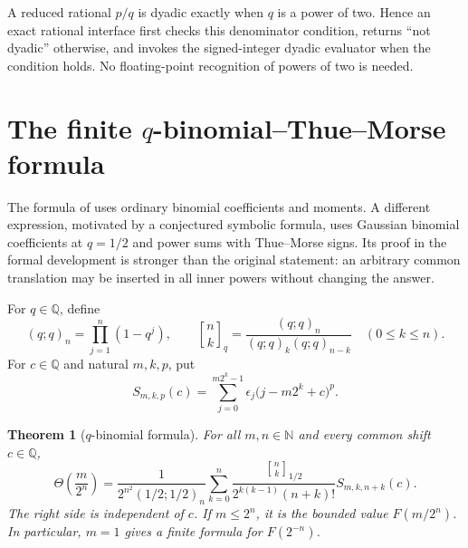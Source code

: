 \documentclass[11pt]{article}
\numberwithin{equation}{section}
\newtheorem{theorem}{Theorem}[section]
\theoremstyle{definition}
\theoremstyle{remark}
\newcommand{\Q}{\mathbb{Q}}
\newcommand{\N}{\mathbb{N}}
\newcommand{\Th}{\Theta}
\newcommand{\qbinom}[2]{\genfrac{[}{]}{0pt}{}{#1}{#2}_{1/2}}
\begin{document}
A reduced rational $p/q$ is dyadic exactly when $q$ is a power of two.  Hence
an exact rational interface first checks this denominator condition, returns
``not dyadic'' otherwise, and invokes the signed-integer dyadic evaluator when
the condition holds.  No floating-point recognition of powers of two is
needed.

\section{The finite \texorpdfstring{$q$}{q}-binomial--Thue--Morse formula}
\label{sec:qbinomial}

The formula of  uses ordinary binomial coefficients
and moments.  A different expression, motivated by a conjectured symbolic
formula, uses Gaussian binomial coefficients at $q=1/2$ and power sums with
Thue--Morse signs.  Its proof in the formal development is stronger than the
original statement: an arbitrary common translation may be inserted in all
inner powers without changing the answer.

For $q\in\Q$, define
\begin{equation}\label{eq:qpochhammer}
 (q;q)_n=\prod_{j=1}^{n}(1-q^j),
 \qquad
 \genfrac{[}{]}{0pt}{}{n}{k}_q=\frac{(q;q)_n}{(q;q)_k(q;q)_{n-k}}
 \quad(0\le k\le n).
\end{equation}
For $c\in\Q$ and natural $m,k,p$, put
\begin{equation}\label{eq:translated-power-sum}
 S_{m,k,p}(c)=
 \sum_{j=0}^{m2^k-1}\epsilon_j
 \bigl(j-m2^k+c\bigr)^p.
\end{equation}

\begin{theorem}[$q$-binomial formula]\label{thm:qbinomial-formula}
For all $m,n\in\N$ and every common shift $c\in\Q$,
\begin{equation}\label{eq:qbinomial-formula}
 \Th\left(\frac{m}{2^n}\right)
 =\frac{1}{2^{n^2}(1/2;1/2)_n}
 \sum_{k=0}^{n}
 \frac{\qbinom{n}{k}}
      {2^{k(k-1)}(n+k)!}
 S_{m,k,n+k}(c).
\end{equation}
The right side is independent of $c$.  If $m\le2^n$, it is the bounded value
$F(m/2^n)$.  In particular, $m=1$ gives a finite formula for
$F(2^{-n})$.
\end{theorem}
\end{document}

